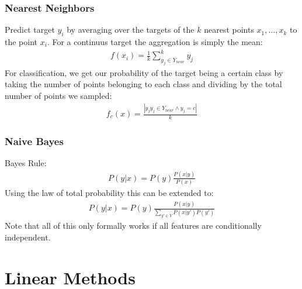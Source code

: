 \documentclass{report}
\begin{document}
\subsection{Nearest Neighbors}
Predict target $y_i$ by averaging over the targets of the $k$ nearest points $x_1, \hdots, x_k$ to the point $x_i$.
For a continuus target the aggregation is simply the mean:
\begin{align}
 f(x_i) = \frac{1}{k} \sum_{y_j \in Y_{near}}^{k} y_j
\end{align}
For classification, we get our probability of the target being a certain class by taking the number of points belonging to each class and dividing by the total number of points we sampled:
\begin{align}
 f_c(x) = \frac{|y_j y_j \in Y_{near} \wedge y_j = c|}{k}
\end{align}
%
\subsection{Naive Bayes}
Bayes Rule:
\begin{align}
 P(y|x) = P(y) \frac{P(x|y)}{P(x)}
\end{align}
Using the law of total probability this can be extended to:
\begin{align}
 P(y|x) = P(y) \frac{P(x|y)}{\sum_{y' \in Y}P(x|y')P(y')}
\end{align}
Note that all of this only formally works if all features are conditionally independent.
%
\chapter{Linear Methods}
\end{document}

